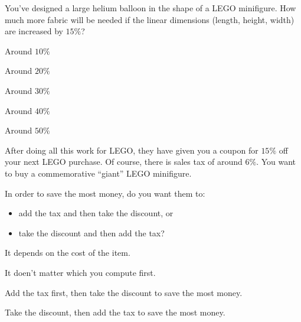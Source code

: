 \documentclass{ximera}
\begin{document}
\begin{exercise}
  You've designed a large helium balloon in the shape of a LEGO
  minifigure. How much more fabric will be needed if the linear dimensions (length, height, width) are increased by $15\%$?
  \begin{enumerate}\begin{multicols}{2}
    \item Around $10\%$
    \item Around $20\%$
    \item Around $30\%$
    \item Around $40\%$
    \item Around $50\%$
    \end{multicols}
  \end{enumerate}
\end{exercise}

\begin{exercise}
  After doing all this work for LEGO, they have given you a coupon for
  $15\%$ off your next LEGO purchase. Of course, there is sales tax of
  around $6\%$.  You want to buy a commemorative ``giant'' LEGO
  minifigure.

  In order to save the most money, do you want them to:
  \begin{itemize}
  \item add the tax and then take the discount, or
  \item take the discount and then add the tax?
  \end{itemize}
  \begin{enumerate}\begin{multicols}{2}
  \item It depends on the cost of the item.
  \item It doen't matter which you compute first.
  \item Add the tax first, then take the discount to save the most money.
  \item Take the discount, then add the tax to save the most money.
    \end{multicols}
  \end{enumerate}
\end{exercise}





\end{document}
